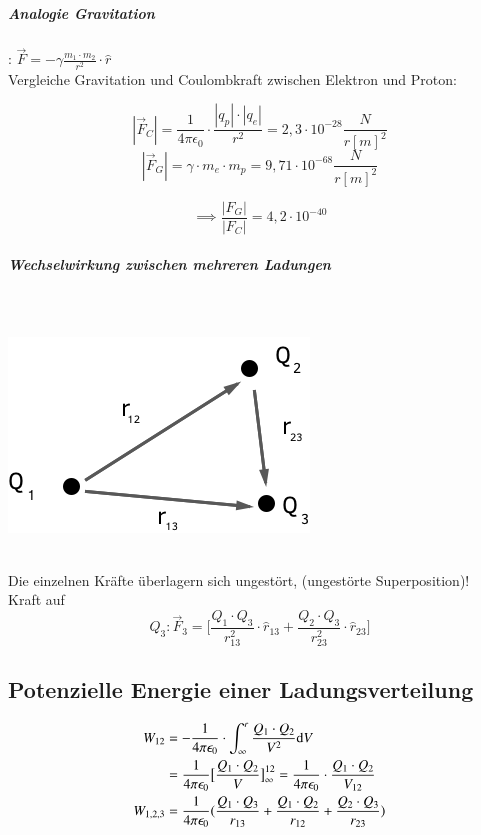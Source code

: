 \documentclass[11pt]{article}
\begin{document}
\hfill\\

\noindent{}

\subparagraph{Analogie Gravitation}: $\vec{F} = -\gamma\frac{m_1\cdot m_2}{r^2}\cdot\hat r$\\

Vergleiche Gravitation und Coulombkraft zwischen Elektron und Proton:

$$ |\vec{F}_C| = \frac{1}{4\pi\epsilon_0}\cdot\frac{|q_p|\cdot|q_e|}{r^2}= 2,3\cdot10^{ -28 } \frac{N}{r[m]^2} $$
$$ |\vec{F}_G|= \gamma\cdot m_e\cdot m_p  = 9,71\cdot10^{-68} \frac{N}{r[m]^2}$$

$$ \implies \frac{|F_G|}{|F_C|} = 4,2\cdot10^{-40} $$

\subparagraph{Wechselwirkung zwischen mehreren Ladungen}\\

\hfill\\

\includegraphics{skizzen/14/14_2B1}

\hfill\\

Die einzelnen Kräfte überlagern sich ungestört, (ungestörte Superposition)!\\

Kraft auf $$ Q_3: \vec{F}_3 = \bigg[\frac{Q_1\cdot Q_3}{r^2_{13}}\cdot\hat{r}_{13}+\frac{Q_2\cdot Q_3}{r^2_{23}}\cdot\hat{r}_{23}\bigg]$$ 


\subsection{Potenzielle Energie einer Ladungsverteilung}


\begin{align*}
\displaystyle W_{12} &= -\frac{1}{4\pi\epsilon_0}\cdot\int_{\infty}^{r} \frac{Q_1\cdot Q_2}{V^2}  \mathrm{d}V\\
&=\frac{1}{4\pi\epsilon_0} \big[\frac{Q_1\cdot Q_2}{V}\big]^{12}_\infty = \frac{1}{4\pi\epsilon_0}\cdot \frac{Q_1\cdot Q_2}{V_{12}}
\hfill\\
W_{1,2,3} &= \frac{1}{4\pi\epsilon_0}(\frac{Q_1\cdot Q_3}{r_{13}}+\frac{Q_1\cdot Q_2}{r_{12}}+\frac{Q_2\cdot Q_3}{r_{23}})
\end{align*}
\end{document}
